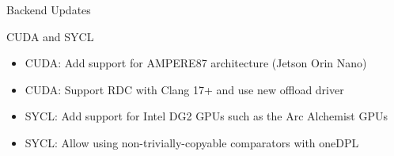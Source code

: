 
\begin{frame}[fragile]

  {\Huge Backend Updates}

  \vspace{10pt}

\end{frame}






\begin{frame}[fragile]{CUDA and SYCL}
  \begin{itemize}
    \item CUDA: Add support for AMPERE87 architecture (Jetson Orin Nano)
    \item CUDA: Support RDC with Clang 17+ and use new offload driver
    \item SYCL: Add support for Intel DG2 GPUs such as the Arc Alchemist GPUs
    \item SYCL: Allow using non-trivially-copyable comparators with oneDPL
  \end{itemize}
\end{frame}


